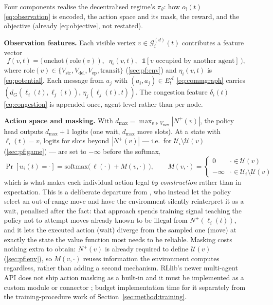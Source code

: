 \documentclass[../main.tex]{subfiles}
\begin{document}
Four components realise the decentralised regime's $\pi_\theta$: how
$o_i(t)$ \eqref{eq:observation} is encoded, the action space and its mask,
the reward, and the objective (already \eqref{eq:objective}, not restated).

\textbf{Observation features.} Each visible vertex $v \in
\mathcal{G}_i^{(d)}(t)$ contributes a feature vector
\begin{equation}
  f(v,t) = \bigl(\, \mathrm{onehot}(\mathrm{role}(v)),\;\; \eta_i(v,t),\;\;
                    \mathbb{1}[v \text{ occupied by another agent}] \,\bigr) ,
  \label{eq:features}
\end{equation}
where $\mathrm{role}(v) \in \{V_{\mathrm{str}}, V_{\mathrm{del}}, V_{\mathrm{ep}},
\text{transit}\}$ (\ref{sec:pf:env}) and $\eta_i(v,t)$ is
\eqref{eq:potential}. Each message from $a_j$ with $(a_i,a_j)\in
E^{\mathcal{A}}_t$ \eqref{eq:commgraph} carries $(d_G(\ell_i(t),\ell_j(t)),\,
\eta_j(\ell_j(t),t))$. The congestion feature $\delta_i(t)$
\eqref{eq:congestion} is appended once, agent-level rather than per-node.

\textbf{Action space and masking.} With $d_{\max} = \max_{v\in V_{\mathrm{mov}}}
|N^{+}(v)|$, the policy head outputs $d_{\max}+1$ logits (one wait, $d_{\max}$
move slots). At a state with $\ell_i(t)=v$, logits for slots beyond
$|N^{+}(v)|$ --- i.e.\ for $\mathcal{U}_i \setminus \mathcal{U}(v)$
(\ref{sec:pf:game}) --- are set to $-\infty$ before the softmax,
\begin{equation}
  \Pr[u_i(t) = \cdot] = \mathrm{softmax}\bigl(\, \ell(\cdot) + M(v,\cdot) \,\bigr),
  \qquad M(v,\cdot) = \begin{cases} 0 & \cdot \in \mathcal{U}(v) \\
                                     -\infty & \cdot \in \mathcal{U}_i\setminus\mathcal{U}(v) \end{cases}
  \label{eq:mask}
\end{equation}
which is what makes each individual action legal \emph{by construction}
rather than in expectation. This is a deliberate departure from
\citet{knippenberg2021}, who instead let the policy select an out-of-range
move and have the environment silently reinterpret it as a wait, penalised
after the fact: that approach spends training signal teaching the policy not
to attempt moves already known to be illegal from $N^{+}(\ell_i(t))$, and it
lets the executed action (wait) diverge from the sampled one (move) at
exactly the state the value function most needs to be reliable. Masking
costs nothing extra to obtain: $N^{+}(v)$ is already required to define
$\mathcal{U}(v)$ (\ref{sec:pf:env}), so $M(v,\cdot)$ reuses information the
environment computes regardless, rather than adding a second mechanism.
RLlib's newer multi-agent API does not ship
action masking as a built-in and it must be implemented as a custom module or
connector \citep{rllibmultiagent}; budget implementation time for it
separately from the training-procedure work of
Section~\ref{sec:method:training}.
\end{document}
